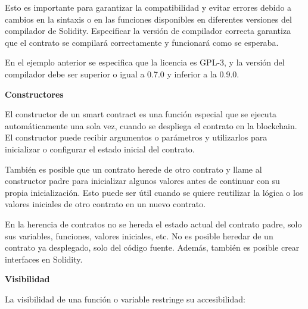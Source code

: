 \bigskip

Esto es importante para garantizar la compatibilidad y evitar errores debido a cambios en la sintaxis o en las funciones disponibles en diferentes versiones del compilador de Solidity. Especificar la versión de compilador correcta garantiza que el contrato se compilará correctamente y funcionará como se esperaba.

\bigskip



En el ejemplo anterior se especifica que la licencia es GPL-3, y la versión del compilador debe ser superior o igual a 0.7.0 y inferior a la 0.9.0.


\bigskip

\textbf{Constructores}

\bigskip

El constructor de un smart contract es una función especial que se ejecuta automáticamente una sola vez, cuando se despliega el contrato en la blockchain. El constructor puede recibir argumentos o parámetros y utilizarlos para inicializar o configurar el estado inicial del contrato.

\bigskip

También es posible que un contrato herede de otro contrato y llame al constructor padre para inicializar algunos valores antes de continuar con su propia inicialización. Esto puede ser útil cuando se quiere reutilizar la lógica o los valores iniciales de otro contrato en un nuevo contrato.

\bigskip    



En la herencia de contratos no se hereda el estado actual del contrato padre, solo sus variables, funciones, valores iniciales, etc. No es posible heredar de un contrato ya desplegado, solo del código fuente. Además, también es posible crear interfaces en Solidity.

\newpage

\bigskip

\textbf{Visibilidad}

\bigskip

La visibilidad de una función o variable restringe su accesibilidad:

